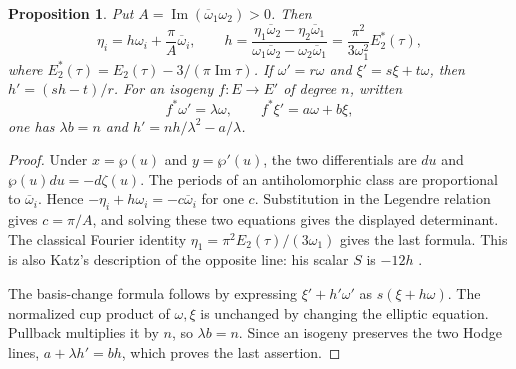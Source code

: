 \documentclass[11pt]{article}
\newtheorem{proposition}[theorem]{Proposition}
\theoremstyle{definition}\newtheorem{definition}[theorem]{Definition}
\theoremstyle{remark}\newtheorem{remark}[theorem]{Remark}
\begin{document}
\begin{proposition}\label{prop:h-formula}
Put $A=\operatorname{Im}(\overline\omega_1\omega_2)>0$. Then
\[
 \eta_i=h\omega_i+\frac{\pi}{A}\overline\omega_i,\qquad
 h=\frac{\eta_1\overline\omega_2-\eta_2\overline\omega_1}
          {\omega_1\overline\omega_2-\omega_2\overline\omega_1}
   =\frac{\pi^2}{3\omega_1^2}E_2^*(\tau),
\]
where $E_2^*(\tau)=E_2(\tau)-3/(\pi\operatorname{Im}\tau)$.
If $\omega'=r\omega$ and $\xi'=s\xi+t\omega$, then $h'=(sh-t)/r$.
For an isogeny $f:E\to E'$ of degree $n$, written
\[
 f^*\omega'=\lambda\omega,\qquad f^*\xi'=a\omega+b\xi,
\]
one has $\lambda b=n$ and $h'=nh/\lambda^2-a/\lambda$.
\end{proposition}
\begin{proof}
Under $x=\wp(u)$ and $y=\wp'(u)$, the two differentials are $du$ and $\wp(u)du=-d\zeta(u)$. The periods of an antiholomorphic class are proportional to $\overline\omega_i$. Hence $-\eta_i+h\omega_i=-c\overline\omega_i$ for one $c$. Substitution in the Legendre relation gives $c=\pi/A$, and solving these two equations gives the displayed determinant. The classical Fourier identity $\eta_1=\pi^2E_2(\tau)/(3\omega_1)$ gives the last formula. This is also Katz's description of the opposite line: his scalar $S$ is $-12h$ \cite[Lemma 1.3.6 and (1.3.7), p.~467; (1.3.10), p.~468]{Katz}.

The basis-change formula follows by expressing $\xi'+h'\omega'$ as $s(\xi+h\omega)$. The normalized cup product of $\omega,\xi$ is unchanged by changing the elliptic equation. Pullback multiplies it by $n$, so $\lambda b=n$. Since an isogeny preserves the two Hodge lines, $a+\lambda h'=bh$, which proves the last assertion.
\end{proof}
\end{document}
